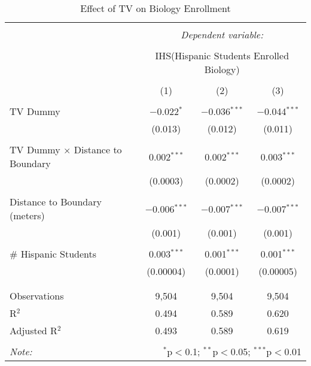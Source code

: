 
\begin{table}[!htbp] \centering 
  \caption{Effect of TV on Biology Enrollment} 
  \label{} 
\begin{tabular}{@{\extracolsep{-2pt}}lccc} 
\\[-1.8ex]\hline 
\hline \\[-1.8ex] 
 & \multicolumn{3}{c}{\textit{Dependent variable:}} \\ 
\cline{2-4} 
\\[-1.8ex] & \multicolumn{3}{c}{IHS(Hispanic Students Enrolled Biology)} \\ 
\\[-1.8ex] & (1) & (2) & (3)\\ 
\hline \\[-1.8ex] 
 TV Dummy & $-$0.022$^{*}$ & $-$0.036$^{***}$ & $-$0.044$^{***}$ \\ 
  & (0.013) & (0.012) & (0.011) \\ 
  & & & \\ 
 TV Dummy $\times$ Distance to Boundary & 0.002$^{***}$ & 0.002$^{***}$ & 0.003$^{***}$ \\ 
  & (0.0003) & (0.0002) & (0.0002) \\ 
  & & & \\ 
 Distance to Boundary (meters) & $-$0.006$^{***}$ & $-$0.007$^{***}$ & $-$0.007$^{***}$ \\ 
  & (0.001) & (0.001) & (0.001) \\ 
  & & & \\ 
 \# Hispanic Students & 0.003$^{***}$ & 0.001$^{***}$ & 0.001$^{***}$ \\ 
  & (0.00004) & (0.0001) & (0.00005) \\ 
  & & & \\ 
\hline \\[-1.8ex] 
Observations & 9,504 & 9,504 & 9,504 \\ 
R$^{2}$ & 0.494 & 0.589 & 0.620 \\ 
Adjusted R$^{2}$ & 0.493 & 0.589 & 0.619 \\ 
\hline 
\hline \\[-1.8ex] 
\textit{Note:}  & \multicolumn{3}{r}{$^{*}$p$<$0.1; $^{**}$p$<$0.05; $^{***}$p$<$0.01} \\ 
\end{tabular} 
\end{table} 

